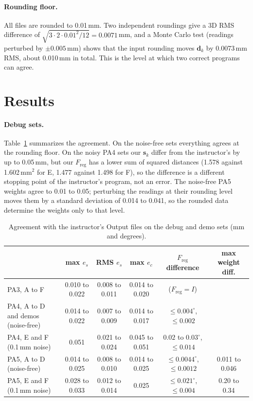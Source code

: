 \documentclass[10pt]{article}
\newcommand{\vect}[1]{\mathbf{#1}}
\newcommand{\F}{F_{\mathrm{reg}}}
\begin{document}
\paragraph{Rounding floor.} All files are rounded to 0.01\,mm. Two independent roundings give a 3D RMS difference of $\sqrt{3\cdot2\cdot0.01^2/12}=0.0071$\,mm, and a Monte Carlo test (readings perturbed by $\pm0.005$\,mm) shows that the input rounding moves $\vect d_k$ by 0.0073\,mm RMS, about 0.010\,mm in total. This is the level at which two correct programs can agree.

\section{Results}

\paragraph{Debug sets.} Table~\ref{tab:debug} summarizes the agreement. On the noise-free sets everything agrees at the rounding floor. On the noisy PA4 sets our $\vect s_k$ differ from the instructor's by up to 0.05\,mm, but our $\F$ has a lower sum of squared distances (1.578 against 1.602\,mm$^2$ for E, 1.477 against 1.498 for F), so the difference is a different stopping point of the instructor's program, not an error. The noise-free PA5 weights agree to 0.01 to 0.05; perturbing the readings at their rounding level moves them by a standard deviation of 0.014 to 0.041, so the rounded data determine the weights only to that level.

\begin{table}[H]
\centering\footnotesize\setlength{\tabcolsep}{4pt}
\caption{Agreement with the instructor's Output files on the debug and demo sets (mm and degrees).}\label{tab:debug}
\begin{tabular}{@{}lccccc@{}}
\toprule
 & max $e_s$ & RMS $e_s$ & max $e_c$ & $\F$ difference & max weight diff. \\
\midrule
PA3, A to F & 0.010 to 0.022 & 0.008 to 0.011 & 0.014 to 0.020 & ($\F=I$) & \\
PA4, A to D and demos (noise-free) & 0.014 to 0.022 & 0.007 to 0.009 & 0.014 to 0.017 & $\le0.004^\circ$, $\le0.002$ & \\
PA4, E and F (0.1\,mm noise) & 0.051 & 0.021 to 0.024 & 0.045 to 0.051 & $0.02$ to $0.03^\circ$, $\le0.014$ & \\
PA5, A to D (noise-free) & 0.014 to 0.025 & 0.008 to 0.010 & 0.014 to 0.025 & $\le0.0044^\circ$, $\le0.0012$ & 0.011 to 0.046 \\
PA5, E and F (0.1\,mm noise) & 0.028 to 0.033 & 0.012 to 0.014 & 0.025 & $\le0.021^\circ$, $\le0.004$ & 0.20 to 0.34 \\
\bottomrule
\end{tabular}
\end{table}
\end{document}
